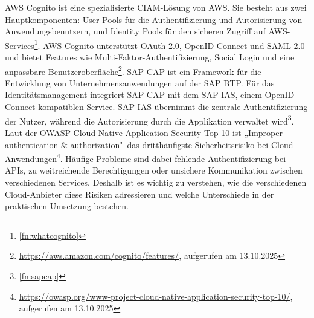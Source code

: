 \newline
AWS Cognito ist eine spezialisierte \ac{CIAM}-Lösung von \ac{AWS}. Sie besteht aus zwei Hauptkomponenten: User Pools für die Authentifizierung und Autorisierung von Anwendungsbenutzern, und Identity Pools für den sicheren Zugriff auf \ac{AWS}-Services\footnote{\ref{fn:whatcognito}}. AWS Cognito unterstützt OAuth 2.0, OpenID Connect und SAML 2.0 und bietet Features wie Multi-Faktor-Authentifizierung, Social Login und eine anpassbare Benutzeroberfläche\footnote{\label{fn:cognito}\url{https://aws.amazon.com/cognito/features/}, aufgerufen am 13.10.2025}.
\newline
\ac{SAP CAP} ist ein Framework für die Entwicklung von Unternehmensanwendungen auf der \ac{SAP BTP}. Für das Identitätsmanagement integriert \ac{SAP CAP} mit dem \ac{SAP IAS}, einem OpenID Connect-kompatiblen Service. \ac{SAP IAS} übernimmt die zentrale Authentifizierung der Nutzer, während die Autorisierung durch die Applikation verwaltet wird\footnote{\ref{fn:sapcap}}.
\newline
Laut der \ac{OWASP} Cloud-Native Application Security Top 10 ist „Improper authentication \& authorization"\ das dritthäufigste Sicherheitsrisiko bei Cloud-Anwendungen\footnote{\label{fn:owaspcloudnative}\url{https://owasp.org/www-project-cloud-native-application-security-top-10/}, aufgerufen am 13.10.2025}. Häufige Probleme sind dabei fehlende Authentifizierung bei APIs, zu weitreichende Berechtigungen oder unsichere Kommunikation zwischen verschiedenen Services. Deshalb ist es wichtig zu verstehen, wie die verschiedenen Cloud-Anbieter diese Risiken adressieren und welche Unterschiede in der praktischen Umsetzung bestehen.
\newline

